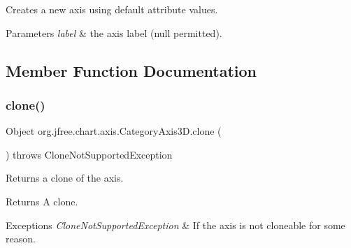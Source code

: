 Creates a new axis using default attribute values.


\begin{DoxyParams}{Parameters}
{\em label} & the axis label ({\ttfamily null} permitted). \\
\hline
\end{DoxyParams}


\subsection{Member Function Documentation}
\mbox{\label{classorg_1_1jfree_1_1chart_1_1axis_1_1_category_axis3_d_aee5e4c02d42b934c7476f6e696d078fe}} 
\subsubsection{\texorpdfstring{clone()}{clone()}}
{\footnotesize\ttfamily Object org.\+jfree.\+chart.\+axis.\+Category\+Axis3\+D.\+clone (\begin{DoxyParamCaption}{ }\end{DoxyParamCaption}) throws Clone\+Not\+Supported\+Exception}

Returns a clone of the axis.

\begin{DoxyReturn}{Returns}
A clone.
\end{DoxyReturn}

\begin{DoxyExceptions}{Exceptions}
{\em Clone\+Not\+Supported\+Exception} & If the axis is not cloneable for some reason. \\
\hline
\end{DoxyExceptions}
\mbox{\label{classorg_1_1jfree_1_1chart_1_1axis_1_1_category_axis3_d_aeadc465986ab12962ad0542eca769cde}} 
